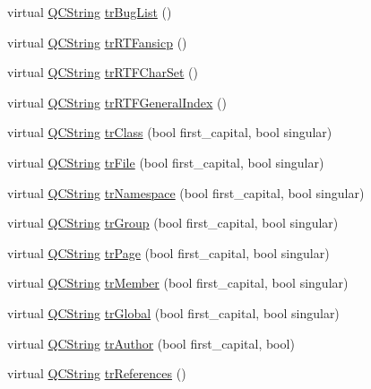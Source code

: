 \begin{DoxyCompactItemize}
\item 
virtual \hyperlink{class_q_c_string}{Q\-C\-String} \hyperlink{class_translator_swedish_a6922767c9b6ff214503967c6f8b66468}{tr\-Bug\-List} ()
\item 
virtual \hyperlink{class_q_c_string}{Q\-C\-String} \hyperlink{class_translator_swedish_ac711f1a109c3c8131bf02a9ff6f48e36}{tr\-R\-T\-Fansicp} ()
\item 
virtual \hyperlink{class_q_c_string}{Q\-C\-String} \hyperlink{class_translator_swedish_af3bba50fd4e382b113171e132e88719b}{tr\-R\-T\-F\-Char\-Set} ()
\item 
virtual \hyperlink{class_q_c_string}{Q\-C\-String} \hyperlink{class_translator_swedish_a6a04ffa0f1114981e258cf0a94478c98}{tr\-R\-T\-F\-General\-Index} ()
\item 
virtual \hyperlink{class_q_c_string}{Q\-C\-String} \hyperlink{class_translator_swedish_a2b5bc0be4e846d4ee6e3430ddeb3cf53}{tr\-Class} (bool first\-\_\-capital, bool singular)
\item 
virtual \hyperlink{class_q_c_string}{Q\-C\-String} \hyperlink{class_translator_swedish_abb09819793310c18e4b39a4691b8e681}{tr\-File} (bool first\-\_\-capital, bool singular)
\item 
virtual \hyperlink{class_q_c_string}{Q\-C\-String} \hyperlink{class_translator_swedish_a5e5011ab1245fd64707347dae129c574}{tr\-Namespace} (bool first\-\_\-capital, bool singular)
\item 
virtual \hyperlink{class_q_c_string}{Q\-C\-String} \hyperlink{class_translator_swedish_a2825eb7956ddf759028c8957352e627d}{tr\-Group} (bool first\-\_\-capital, bool singular)
\item 
virtual \hyperlink{class_q_c_string}{Q\-C\-String} \hyperlink{class_translator_swedish_a719e433b483932299fd17e751decdfb2}{tr\-Page} (bool first\-\_\-capital, bool singular)
\item 
virtual \hyperlink{class_q_c_string}{Q\-C\-String} \hyperlink{class_translator_swedish_aaded5c915d8cd335abcd0e65e535cd71}{tr\-Member} (bool first\-\_\-capital, bool singular)
\item 
virtual \hyperlink{class_q_c_string}{Q\-C\-String} \hyperlink{class_translator_swedish_ac9f8f800abe2f721d9cf0bdfc9b6ec6f}{tr\-Global} (bool first\-\_\-capital, bool singular)
\item 
virtual \hyperlink{class_q_c_string}{Q\-C\-String} \hyperlink{class_translator_swedish_a0b7d86ba5eaed1bb4e7ea1036d6626c6}{tr\-Author} (bool first\-\_\-capital, bool)
\item 
virtual \hyperlink{class_q_c_string}{Q\-C\-String} \hyperlink{class_translator_swedish_a54eaa9a933568bfd7eaffe36b7872eb0}{tr\-References} ()

\end{DoxyCompactItemize}
